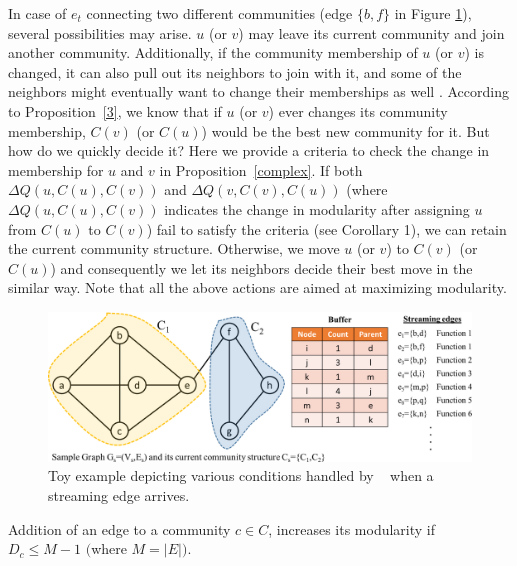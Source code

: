 
In case of $e_t$ connecting two different communities (edge $\{b,f\}$ in Figure \ref{fig_algo}), several possibilities may arise. $u$ (or $v$) may leave its current community and join another community. Additionally, if the community membership of $u$ (or $v$) is changed, it can also pull out its neighbors to join with it, and some of the neighbors might eventually want to change their memberships as well \cite{pone.0091431}. According to Proposition~\ref{3}, we know that if $u$ (or $v$) ever changes its community membership, $C(v)$ (or $C(u)$) would be the best new community for it. But how do we quickly decide it? Here we provide a criteria to check the change in membership for $u$ and $v$ in Proposition~\ref{complex}. If both $\Delta Q(u,C(u),C(v))$ and $\Delta Q(v,C(v),C(u))$ (where $\Delta Q(u,C(u),C(v))$ indicates the change in modularity after assigning $u$ from $C(u)$ to $C(v)$) fail to satisfy the criteria (see Corollary 1), we can retain the current community structure. Otherwise, we move $u$ (or $v$) to $C(v)$ (or $C(u)$) and consequently we let its neighbors decide their best move in the similar way. %
Note that all the above actions are aimed at maximizing modularity.

\begin{figure}[!t]
\centering
\includegraphics[width=\columnwidth]{./texfiles/Chapter_2/figures/demo.eps}
\caption{Toy example depicting various conditions handled by \compas~ when a streaming edge arrives.}\label{fig_algo} 
\end{figure}


\begin{prop}\label{1}
Addition of an edge to a community $c\in C$, increases its modularity if $D_c\leq M-1$ $($where $M=|E|)$.
\end{prop}


